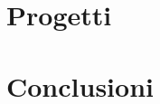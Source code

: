 \documentclass[12pt,a4paper,openright,twoside]{book}
\begin{document}
\chapter{Progetti} %
\label{chap:projects}

\chapter{Conclusioni}
\label{chap:conclusions}





\end{document}
